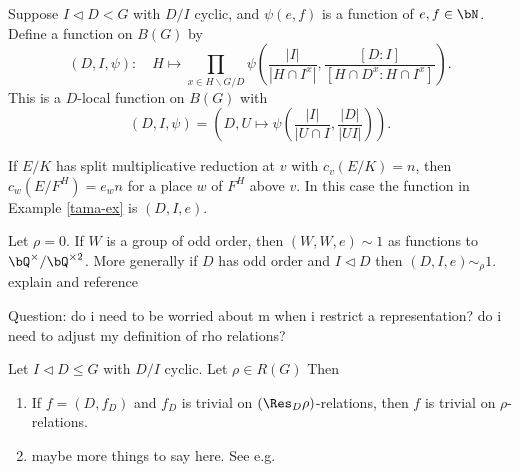 \begin{defn}\cite[Definition 2.35]{reg-const}\label{D-I-fn}
    Suppose $I \triangleleft D < G$ with $D / I$ cyclic, and $\psi(e,f)$ is a function of $e, f \in \bN$. Define a function on $B(G)$ by 
    \[ \left(D, I, \psi\right) \colon \quad H \mapsto \prod_{x \in H\backslash G / D} \psi\left(\frac{|I|}{|H \cap I^x|}, \frac{[D \colon I]}{[H \cap D^x \colon H \cap I^x]}\right). \]
    This is a $D$-local function on $B(G)$ with
    \[ (D, I, \psi) = \left(D, U \mapsto \psi(\frac{|I|}{|U \cap I}, \frac{|D|}{|UI|})\right). \]
\end{defn}

\begin{example}
    If $E / K$ has split multiplicative reduction at $v$ with $c_v(E / K) = n$, then $c_w(E / F^H) = e_w n$ for a place $w$ of $F^H$ above $v$. In this case the function in Example \ref{tama-ex} is $(D, I, e)$. 
\end{example}

\begin{example}\label{trivial-on-brauer}
    Let $\rho = 0$. If $W$ is a group of odd order, then $(W, W, e) \sim 1$ as functions to $\bQ^{\times} / \bQ^{\times 2}$.
    More generally if $D$ has odd order and $I \triangleleft D$ then $(D, I, e) \sim_{\rho} 1$. {\color{red} explain and reference}
\end{example}

{\color{red} Question: do i need to be worried about m when i restrict a representation? do i need to adjust my definition of rho relations?}
\begin{prop}
    Let $I \triangleleft D \leq G$ with $D / I$ cyclic. Let $\rho \in R(G)$ Then
    \begin{enumerate}
        \item If $f = (D, f_D)$ and $f_D$ is trivial on $(\Res_D \rho)$-relations, then $f$ is trivial on $\rho$-relations.
        \item {\color{red} maybe more things to say here. See e.g. \cite[Theorem 2.36]{reg-const}}  
    \end{enumerate}
\end{prop}


